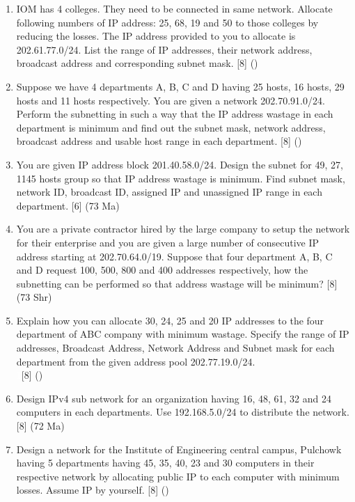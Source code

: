 \documentclass[12pt]{article}
\newcommand{\enter}{\\\textcolor{white}{1}}
\begin{document}
\begin{enumerate}
			\item IOM has 4 colleges. They need to be connected in same network. Allocate following numbers of IP address: 25, 68, 19 and 50 to those colleges by reducing the losses. The IP address provided to you to allocate is 202.61.77.0/24. List the range of IP addresses, their network address, broadcast address and corresponding subnet mask. \hfill [8] ()

			\item Suppose we have 4 departments A, B, C and D having 25 hosts, 16 hosts, 29 hosts and 11 hosts respectively. You are given a network 202.70.91.0/24. Perform the subnetting in such a way that the IP address wastage in each department is minimum and find out the subnet mask, network address, broadcast address and usable host range in each department. \hfill [8] ()

			\item You are given IP address block 201.40.58.0/24. Design the subnet for 49, 27, 1145 hosts group so that IP address wastage is minimum. Find subnet mask, network ID, broadcast ID, assigned IP and unassigned IP range in each department. \hfill [6] (73 Ma)

			\item You are a private contractor hired by the large company to setup the network for their enterprise and you are given a large number of consecutive IP address starting at 202.70.64.0/19. Suppose that four department A, B, C and D request 100, 500, 800 and 400 addresses respectively, how the subnetting can be performed so that address wastage will be minimum? \hfill [8] (73 Shr)

			\item Explain how you can allocate 30, 24, 25 and 20 IP addresses to the four department of ABC company with minimum wastage. Specify the range of IP addresses, Broadcast Address, Network Address and Subnet mask for each department from the given address pool 202.77.19.0/24.
			\enter\hfill [8] ()

			\item Design IPv4 sub network for an organization having 16, 48, 61, 32 and 24 computers in each departments. Use 192.168.5.0/24 to distribute the network. \hfill [8] (72 Ma)

			\item Design a network for the Institute of Engineering central campus, Pulchowk having 5 departments having 45, 35, 40, 23 and 30 computers in their respective network by allocating public IP to each computer with minimum losses. Assume IP by yourself. \hfill [8] ()


\end{enumerate}
\end{document}
